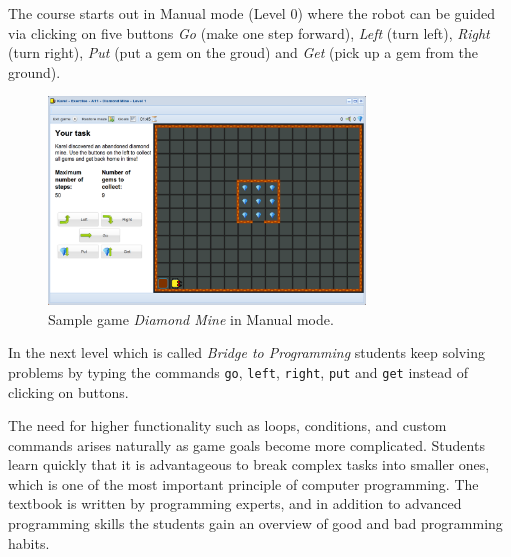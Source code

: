 \documentclass[article,A4,12pt]{llncs}
\begin{document}
The course starts out in Manual mode (Level 0) where the robot can be guided via 
clicking on five buttons {\em Go} (make one step forward), {\em Left} (turn left), {\em Right} 
(turn right), {\em Put} (put a gem on the groud) and {\em Get} (pick up a gem from the ground). 

\begin{figure}[!ht]
\begin{center}
\includegraphics[width=0.75\textwidth]{img/fore-1.png}
\end{center}
\vspace{-2mm}
\caption{Sample game {\em Diamond Mine} in Manual mode.}
\label{fig:f1}
\vspace{-4mm}
\end{figure}
\noindent
In the next level which is called {\em Bridge to Programming} students keep solving 
problems by typing the commands {\tt go}, {\tt left}, {\tt right}, {\tt put} and {\tt get} 
instead of clicking on buttons. 

The need for higher functionality such as loops, conditions, and custom commands arises 
naturally as game goals become more complicated. 
Students learn quickly that it is advantageous to break complex tasks into smaller 
ones, which is one of the most important principle of computer 
programming. The textbook is written by programming experts, and in addition to 
advanced programming skills the students gain an overview of good and bad 
programming habits.
\end{document}
